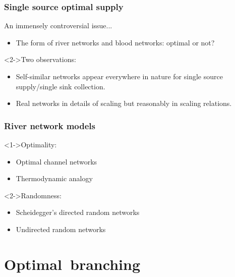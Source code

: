 \begin{frame}
  \frametitle{Single source optimal supply}

  \begin{block}{An immensely controversial issue...}
    \begin{itemize}
    \item<1->
      The form of river networks and blood networks:
      optimal or not?\cite{west1997a,banavar1999a,dodds2001a,dodds2010a}
    \end{itemize}
  \end{block}

  \begin{block}<2->{Two observations:}
    \begin{itemize}
    \item<2->
      Self-similar networks appear everywhere in nature
      for single source supply/single sink collection.
    \item<3->
      Real networks  in \alert{details of scaling}
      but reasonably  in \alert{scaling relations}.
    \end{itemize}
  \end{block}

\end{frame}


\begin{frame}
  \frametitle{River network models}

  \begin{block}<1->{Optimality:}
    \begin{itemize}
    \item<1->Optimal channel networks\cite{rodriguez-iturbe1997a}
    \item<1->Thermodynamic analogy\cite{scheidegger1991a}
    \end{itemize}
  \end{block}
  \begin{block}<2->{Randomness:}
    \begin{itemize}
    \item<2->Scheidegger's directed random networks
    \item<2->Undirected random networks
    \end{itemize}
  \end{block}
  
\end{frame}

\section{Optimal\ branching}

